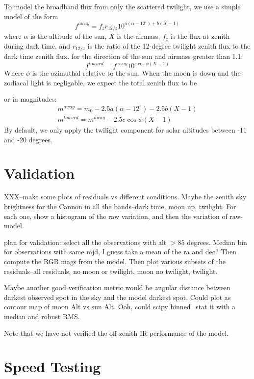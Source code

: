 \documentclass{emulateapj}  %
\begin{document}
To model the broadband flux from only the scattered twilight, we use a simple model of the form
\begin{equation}
  f^{away} = f_{z} r_{12/z} 10^{a(\alpha-12^{\circ})+b(X-1)}
\end{equation}
where $\alpha$ is the altitude of the sun, $X$ is the airmass, $f_{z}$ is the flux at zenith during dark time, and $r_{12/z}$ is the ratio of the 12-degree twilight zenith flux to the dark time zenith flux.
for the direction of the sun and airmass greater than 1.1:
\begin{equation}
  f^{toward} = f^{away}10^{c \cos{\phi}(X-1)}
\end{equation}
Where $\phi$ is the azimuthal relative to the sun. When the moon is down and the zodiacal light is negligable, we expect the total zenith flux to be %

or in magnitudes:
\begin{eqnarray}
  m^{away} = m_0 -2.5a(\alpha-12^{\circ})-2.5b(X-1) \\
  m^{toward} = m^{away} -2.5c\cos{\phi}(X-1)
\end{eqnarray}
By default, we only apply the twilight component for solar altitudes between -11 and -20 degrees.


\section{Validation}

XXX--make some plots of residuals vs different conditions.  Maybe the zenith sky brightness for the Cannon in all the bands--dark time, moon up, twilight.  For each one, show a histogram of the raw variation, and then the variation of raw-model.  

plan for validation:
select all the observations with alt $>85$ degrees. Median bin for observations with same mjd, I guess take a mean of the ra and dec? Then compute the RGB mags from the model.  Then plot various subsets of the residuals--all residuals, no moon or twilight, moon no twilight, twilight.

Maybe another good verification metric would be angular distance between darkest observed spot in the sky and the model darkest spot.  Could plot as contour map of moon Alt vs sun Alt.  Ooh, could scipy binned\_stat it with a median and robust RMS.


Note that we have not verified the off-zenith IR performance of the model.  

\section{Speed Testing}
\end{document}
